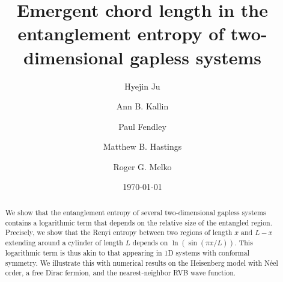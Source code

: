 \documentclass[prl,aps,twocolumn,floatfix,amsmath,amssymb,superscriptaddress,tightenlines]{revtex4}
\begin{document}
\date{\today}
\title{Emergent chord length in the entanglement entropy of
  two-dimensional gapless systems}

\author{Hyejin Ju}

\author{Ann B. Kallin}

\author{Paul Fendley}

\author{Matthew B. Hastings}

\author{Roger G. Melko}

\begin{abstract} 
We show that the entanglement entropy of several two-dimensional
gapless systems contains a logarithmic term that depends 
on the relative size of the entangled region.
Precisely, we show that the Renyi entropy between two
regions of length $x$ and $L-x$ extending around a cylinder of length
$L$ depends on $\ln(\sin(\pi x/L))$. This logarithmic term is thus
akin to that appearing in 1D systems with conformal symmetry. We
illustrate this with numerical results on the Heisenberg model with
N\'eel order, a free Dirac fermion, and the nearest-neighbor RVB wave
function.


 
\end{abstract}
\maketitle
\end{document}
